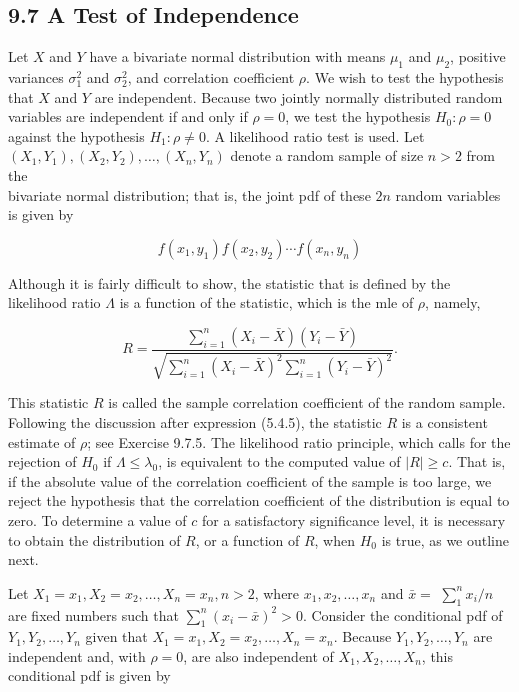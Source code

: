 \subsection*{9.7 A Test of Independence}
Let $X$ and $Y$ have a bivariate normal distribution with means $\mu_{1}$ and $\mu_{2}$, positive variances $\sigma_{1}^{2}$ and $\sigma_{2}^{2}$, and correlation coefficient $\rho$. We wish to test the hypothesis that $X$ and $Y$ are independent. Because two jointly normally distributed random variables are independent if and only if $\rho=0$, we test the hypothesis $H_{0}: \rho=0$ against the hypothesis $H_{1}: \rho \neq 0$. A likelihood ratio test is used. Let $\left(X_{1}, Y_{1}\right),\left(X_{2}, Y_{2}\right), \ldots,\left(X_{n}, Y_{n}\right)$ denote a random sample of size $n>2$ from the\\
bivariate normal distribution; that is, the joint pdf of these $2 n$ random variables is given by

$$
f\left(x_{1}, y_{1}\right) f\left(x_{2}, y_{2}\right) \cdots f\left(x_{n}, y_{n}\right)
$$

Although it is fairly difficult to show, the statistic that is defined by the likelihood ratio $\Lambda$ is a function of the statistic, which is the mle of $\rho$, namely,


\begin{equation*}
R=\frac{\sum_{i=1}^{n}\left(X_{i}-\bar{X}\right)\left(Y_{i}-\bar{Y}\right)}{\sqrt{\sum_{i=1}^{n}\left(X_{i}-\bar{X}\right)^{2} \sum_{i=1}^{n}\left(Y_{i}-\bar{Y}\right)^{2}}} . \tag{9.7.1}
\end{equation*}


This statistic $R$ is called the sample correlation coefficient of the random sample. Following the discussion after expression (5.4.5), the statistic $R$ is a consistent estimate of $\rho$; see Exercise 9.7.5. The likelihood ratio principle, which calls for the rejection of $H_{0}$ if $\Lambda \leq \lambda_{0}$, is equivalent to the computed value of $|R| \geq c$. That is, if the absolute value of the correlation coefficient of the sample is too large, we reject the hypothesis that the correlation coefficient of the distribution is equal to zero. To determine a value of $c$ for a satisfactory significance level, it is necessary to obtain the distribution of $R$, or a function of $R$, when $H_{0}$ is true, as we outline next.

Let $X_{1}=x_{1}, X_{2}=x_{2}, \ldots, X_{n}=x_{n}, n>2$, where $x_{1}, x_{2}, \ldots, x_{n}$ and $\bar{x}=$ $\sum_{1}^{n} x_{i} / n$ are fixed numbers such that $\sum_{1}^{n}\left(x_{i}-\bar{x}\right)^{2}>0$. Consider the conditional pdf of $Y_{1}, Y_{2}, \ldots, Y_{n}$ given that $X_{1}=x_{1}, X_{2}=x_{2}, \ldots, X_{n}=x_{n}$. Because $Y_{1}, Y_{2}, \ldots, Y_{n}$ are independent and, with $\rho=0$, are also independent of $X_{1}, X_{2}, \ldots, X_{n}$, this conditional pdf is given by

